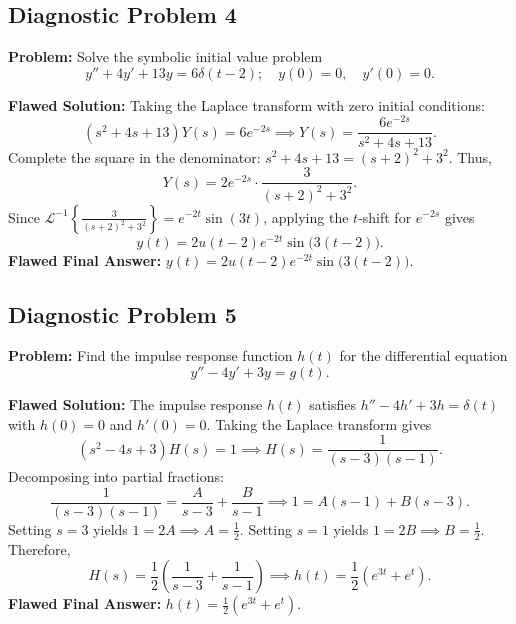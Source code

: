 \documentclass[11pt, letterpaper]{article}
\theoremstyle{definition}
\theoremstyle{remark}
\begin{document}
\subsection{Diagnostic Problem 4}
\textbf{Problem:} Solve the symbolic initial value problem
\[
    y'' + 4y' + 13y = 6\delta(t - 2); \quad y(0) = 0,\quad y'(0) = 0.
\]

\textbf{Flawed Solution:}
Taking the Laplace transform with zero initial conditions:
\[
    (s^2 + 4s + 13)Y(s) = 6e^{-2s} \implies Y(s) = \frac{6e^{-2s}}{s^2 + 4s + 13}.
\]
Complete the square in the denominator: $s^2 + 4s + 13 = (s + 2)^2 + 3^2$. Thus,
\[
    Y(s) = 2e^{-2s}\cdot \frac{3}{(s + 2)^2 + 3^2}.
\]
Since $\mathcal{L}^{-1}\left\{\frac{3}{(s + 2)^2 + 3^2}\right\} = e^{-2t}\sin(3t)$, applying the $t$-shift for $e^{-2s}$ gives
\[
    y(t) = 2u(t - 2)e^{-2t}\sin\bigl(3(t - 2)\bigr).
\]
\textbf{Flawed Final Answer:} $y(t) = 2u(t - 2)e^{-2t}\sin\bigl(3(t - 2)\bigr)$.

\subsection{Diagnostic Problem 5}
\textbf{Problem:} Find the impulse response function $h(t)$ for the differential equation
\[
    y'' - 4y' + 3y = g(t).
\]

\textbf{Flawed Solution:}
The impulse response $h(t)$ satisfies $h'' - 4h' + 3h = \delta(t)$ with $h(0) = 0$ and $h'(0) = 0$. Taking the Laplace transform gives
\[
    (s^2 - 4s + 3)H(s) = 1 \implies H(s) = \frac{1}{(s - 3)(s - 1)}.
\]
Decomposing into partial fractions:
\[
    \frac{1}{(s - 3)(s - 1)} = \frac{A}{s - 3} + \frac{B}{s - 1} \implies 1 = A(s - 1) + B(s - 3).
\]
Setting $s = 3$ yields $1 = 2A \implies A = \frac{1}{2}$. Setting $s = 1$ yields $1 = 2B \implies B = \frac{1}{2}$. Therefore,
\[
    H(s) = \frac{1}{2}\left(\frac{1}{s - 3} + \frac{1}{s - 1}\right) \implies h(t) = \frac{1}{2}\left(e^{3t} + e^{t}\right).
\]
\textbf{Flawed Final Answer:} $h(t) = \frac{1}{2}\left(e^{3t} + e^{t}\right)$.
\end{document}
